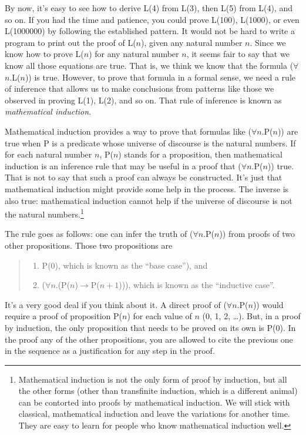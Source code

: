 \label{induction-rationale}
By now, it's easy to see how to derive L(4) from L(3),
then L(5) from L(4), and so on.
If you had the time and patience, you could prove L(100), L(1000), or even L(1000000)
by following the established pattern.
It would not be hard to write a program to print out the proof of L($n$),
given any natural number $n$.
Since we know how to prove L($n$) for any natural number $n$,
it seems fair to say that we know all those equations are true.
That is, we think we know that the formula ($\forall$$n$.L($n$)) is true.
However, to prove that formula in a formal sense,
we need a rule of inference that allows us to make conclusions
from patterns like those we observed in proving L(1), L(2), and so on.
That rule of inference is known as \emph{mathematical induction}.

Mathematical induction provides a way to prove that
formulas like ($\forall$$n$.P($n$)) are true
when P is a predicate whose universe of discourse is the natural numbers.
If for each natural number $n$, P($n$) stands for a proposition,
then mathematical induction is an inference rule that may be useful
in a proof that ($\forall$$n$.P($n$)) true.
That is not to say that such a proof can always be constructed.
It's just that mathematical induction might provide some help in the process.
The inverse is also true: mathematical induction cannot help
if the universe of discourse is not the natural numbers.\footnote{Mathematical
induction is not the only form
of proof by induction, but all the other forms
(other than transfinite induction, which is a different animal)
can be contorted into proofs by mathematical induction.
We will stick with classical, mathematical induction
and leave the variations for another time.
They are easy to learn for people who know mathematical induction well.}

The rule goes as follows: one can infer the truth of ($\forall$$n$.P($n$))
from proofs of two other propositions.
Those two propositions are
\begin{quote}
\begin{enumerate}
\item P(0), which is known as the ``base case''), and
\item ($\forall$$n$.(P($n$)$\rightarrow$P($n+1$))), which is known as the ``inductive case''.
\end{enumerate}
\end{quote}
It's a very good deal if you think about it.
A direct proof of ($\forall$$n$.P($n$)) would require a proof of proposition P($n$)
for each value of $n$ (0, 1, 2, \dots).
But, in a proof by induction, the only proposition that needs to be proved on its own is P(0).
In the proof any of the other propositions,
you are allowed to cite the previous one in the sequence as a justification for any step in the proof.

